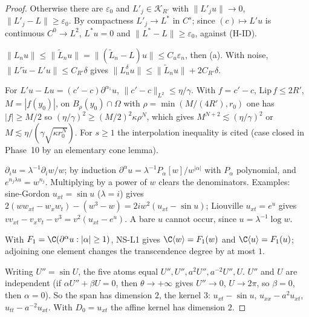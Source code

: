 \begin{proof}
Otherwise there are $\varepsilon_0$ and $L'_j\in\mathcal K_{R'}$ with $\|L'_ju\|\to0$, $\|L'_j-L\|\ge\varepsilon_0$. By compactness $L'_j\to L^*$ in $C^s$; since $(c)\mapsto L'u$ is continuous $C^0\to L^2$, $L^*u=0$ and $\|L^*-L\|\ge\varepsilon_0$, against (H-ID).

$\|L_nu\|\le\|\tilde L_nu\|=\|(\tilde L_n-L)u\|\le C_u\varepsilon_n$, then (a). With noise, $\|L'\tilde u-L'u\|\le C_{R'}\delta$ gives $\|L^\delta_nu\|\le\|\tilde L_n u\|+2C_{R'}\delta$.

For $L'u-Lu=(c'-c)\partial^{\alpha_1}u$, $\|c'-c\|_{L^2}\le\eta/\gamma$. With $f=c'-c$, $\mathrm{Lip}\,f\le2R'$, $M=|f(y_0)|$, on $B_\rho(y_0)\cap\Omega$ with $\rho=\min(M/(4R'),r_0)$ one has $|f|\ge M/2$ so $(\eta/\gamma)^2\ge(M/2)^2\kappa\rho^N$, which gives $M^{N+2}\lesssim(\eta/\gamma)^2$ or $M\lesssim\eta/(\gamma\sqrt{\kappa r_0^N})$. For $s\ge1$ the interpolation inequality is cited (case closed in Phase~10 by an elementary cone lemma).

$\partial_iu=\lambda^{-1}\partial_iw/w$; by induction $\partial^\alpha u=\lambda^{-1}P_\alpha[w]/w^{|\alpha|}$ with $P_\alpha$ polynomial, and $e^{n_j\lambda u}=w^{n_j}$. Multiplying by a power of $w$ clears the denominators. Examples: sine-Gordon $u_{xt}=\sin u$ ($\lambda=i$) gives $2(ww_{xt}-w_xw_t)-(w^3-w)=2iw^2(u_{xt}-\sin u)$; Liouville $u_{xt}=e^u$ gives $vv_{xt}-v_xv_t-v^3=v^2(u_{xt}-e^u)$. A bare $u$ cannot occur, since $u=\lambda^{-1}\log w$.

With $F_1=\C(\partial^\alpha u:|\alpha|\ge1)$, NS-L1 gives $\C\langle w\rangle=F_1(w)$ and $\C\langle u\rangle=F_1(u)$; adjoining one element changes the transcendence degree by at most $1$.

Writing $U''=\sin U$, the five atoms equal $U'',U'',a^2U'',a^{-2}U'',U$. $U''$ and $U$ are independent (if $\alpha U''+\beta U=0$, then $\theta\to+\infty$ gives $U''\to0$, $U\to2\pi$, so $\beta=0$, then $\alpha=0$). So the span has dimension $2$, the kernel $3$: $u_{xt}-\sin u$, $u_{xx}-a^2u_{xt}$, $u_{tt}-a^{-2}u_{xt}$. With $D_0=u_{xt}$ the affine kernel has dimension $2$.

\end{proof}

